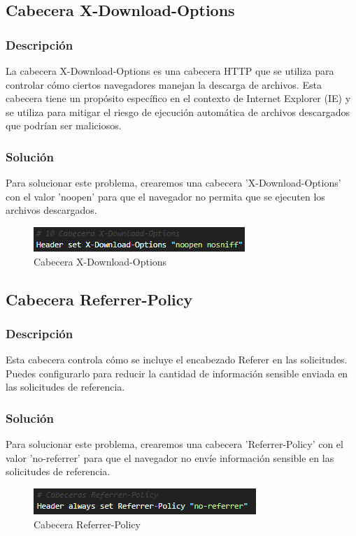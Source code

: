 \documentclass{report}
\begin{document}
            \subsection{Cabecera X-Download-Options}
                \subsubsection{Descripción}
                    La cabecera X-Download-Options es una cabecera HTTP que se utiliza para controlar cómo ciertos navegadores manejan la descarga de archivos. Esta cabecera tiene un propósito específico en el contexto de Internet Explorer (IE) y se utiliza para mitigar el riesgo de ejecución automática de archivos descargados que podrían ser maliciosos.
                \subsubsection{Solución}
                    Para solucionar este problema, crearemos una cabecera 'X-Download-Options' con el valor 'noopen' para que el navegador no permita que se ejecuten los archivos descargados.
                    \begin{figure}[H]
                        \centering
                        \includegraphics[width=\textwidth]{./img/vulnerabilidades/3.5/10.1.png}
                        \caption{Cabecera X-Download-Options}
                    \end{figure}
            \clearpage
            \subsection{Cabecera Referrer-Policy}
                \subsubsection{Descripción}
                    Esta cabecera controla cómo se incluye el encabezado Referer en las solicitudes. Puedes configurarlo para reducir la cantidad de información sensible enviada en las solicitudes de referencia.
                \subsubsection{Solución}
                    Para solucionar este problema, crearemos una cabecera 'Referrer-Policy' con el valor 'no-referrer' para que el navegador no envíe información sensible en las solicitudes de referencia.
                    \begin{figure}[H]
                        \centering
                        \includegraphics[width=\textwidth]{./img/vulnerabilidades/3.5/11.1.png}
                        \caption{Cabecera Referrer-Policy}
                    \end{figure}
            \clearpage
\end{document}
